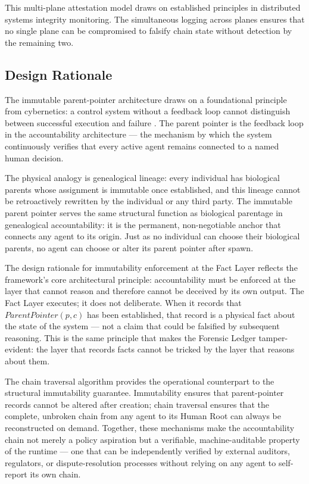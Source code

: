 This multi-plane attestation model draws on established principles in distributed systems integrity monitoring. The simultaneous logging across planes ensures that no single plane can be compromised to falsify chain state without detection by the remaining two.

\subsection{Design Rationale}

The immutable parent-pointer architecture draws on a foundational principle from cybernetics: a control system without a feedback loop cannot distinguish between successful execution and failure \cite{wiener1948}. The parent pointer is the feedback loop in the accountability architecture — the mechanism by which the system continuously verifies that every active agent remains connected to a named human decision.

The physical analogy is genealogical lineage: every individual has biological parents whose assignment is immutable once established, and this lineage cannot be retroactively rewritten by the individual or any third party. The immutable parent pointer serves the same structural function as biological parentage in genealogical accountability: it is the permanent, non-negotiable anchor that connects any agent to its origin. Just as no individual can choose their biological parents, no agent can choose or alter its parent pointer after spawn.

The design rationale for immutability enforcement at the Fact Layer reflects the framework's core architectural principle: accountability must be enforced at the layer that cannot reason and therefore cannot be deceived by its own output. The Fact Layer executes; it does not deliberate. When it records that $\textit{ParentPointer}(p, c)$ has been established, that record is a physical fact about the state of the system — not a claim that could be falsified by subsequent reasoning. This is the same principle that makes the Forensic Ledger tamper-evident: the layer that records facts cannot be tricked by the layer that reasons about them.

The chain traversal algorithm provides the operational counterpart to the structural immutability guarantee. Immutability ensures that parent-pointer records cannot be altered after creation; chain traversal ensures that the complete, unbroken chain from any agent to its Human Root can always be reconstructed on demand. Together, these mechanisms make the accountability chain not merely a policy aspiration but a verifiable, machine-auditable property of the runtime — one that can be independently verified by external auditors, regulators, or dispute-resolution processes without relying on any agent to self-report its own chain.

